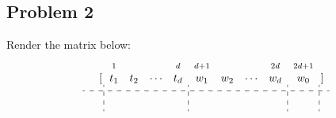 \documentclass{article}
\begin{document}
\subsection{Problem 2}
Render the matrix below:
\[
    \begin{array}{rl@{}:cccc:cccc:c:@{}r r@{}c@{}l}
                           &                                                                                            & \scriptstyle 1 &        &        & \scriptstyle d & \scriptstyle{d+1} &              &        & \scriptstyle{2d} & \scriptstyle{2d+1} &                                                                                                                                                                                                                                                                                               \\
                           & \multirow{1}{*}{$\left[\begin{array}{r}\end{array}\right.$}                                & t_1            & t_2    & \cdots & t_d            & w_1               & w_2          & \cdots & w_d              & w_0                & \multirow{1}{*}{$\left.\begin{array}{r}\end{array}\right]$}                                                                                                                                                                                                                                   \\[0.5em]
            \hdashline
            \rule{0pt}{1.5em}

\end{array}\]
\end{document}
